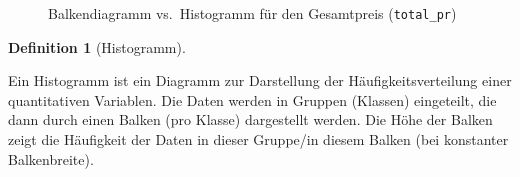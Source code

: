 \documentclass[
  letterpaper,
  twoside,
  open=any]{scrbook}
\theoremstyle{definition}
\theoremstyle{definition}
\theoremstyle{definition}
\newtheorem{definition}{Definition}[chapter]
\theoremstyle{remark}
\begin{document}
\begin{figure}

\begin{minipage}{0.50\linewidth}



\end{minipage}%
%
\begin{minipage}{0.50\linewidth}



\end{minipage}%

\caption{\label{fig-balken-hist}Balkendiagramm vs.~Histogramm für den
Gesamtpreis (\texttt{total\_pr})}

\end{figure}%

\begin{definition}[Histogramm]\protect\hypertarget{def-histogramm}{}\label{def-histogramm}

Ein Histogramm ist ein Diagramm zur Darstellung der
Häufigkeitsverteilung einer quantitativen Variablen. Die Daten werden in
Gruppen (Klassen) eingeteilt, die dann durch einen Balken (pro Klasse)
dargestellt werden. Die Höhe der Balken zeigt die Häufigkeit der Daten
in dieser Gruppe/in diesem Balken (bei konstanter Balkenbreite).

\end{definition}
\end{document}
